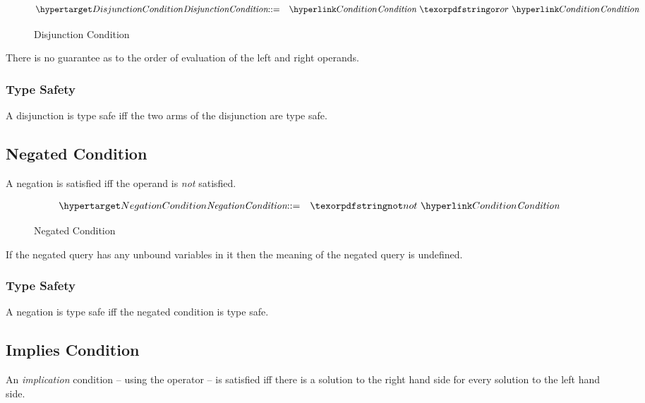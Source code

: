 \begin{figure}[htbp]
\begin{eqnarray*}
\ntDef{DisjunctionCondition}&\arrow&\ntRef{Condition}\ \q{or}\ \ntRef{Condition}
\end{eqnarray*}
\caption{Disjunction Condition}
\label{disjunctionConditionFormFig}
\end{figure}


\begin{aside}
There is no guarantee as to the order of evaluation of the left and right operands.
\end{aside}

\subsubsection{Type Safety}
A disjunction is type safe iff the two arms of the disjunction are type safe.
\begin{prooftree}
\end{prooftree}

\subsection{Negated Condition}
A negation is satisfied iff the operand is \emph{not} satisfied.


\begin{figure}[htbp]
\begin{eqnarray*}
\ntDef{NegationCondition}&\arrow&\q{not}\ \ntRef{Condition}
\end{eqnarray*}
\caption{Negated Condition}
\label{negationConditionFormFig}
\end{figure}

\begin{aside}
If the negated query has any unbound variables in it then the meaning of the negated query is undefined.
\end{aside}

\subsubsection{Type Safety}
A negation is type safe iff the negated condition is type safe.
\begin{prooftree}
\end{prooftree}

\subsection{Implies Condition}
An \emph{implication} condition -- using the  operator -- is satisfied iff there is a solution to the right hand side for every solution to the left hand side.


